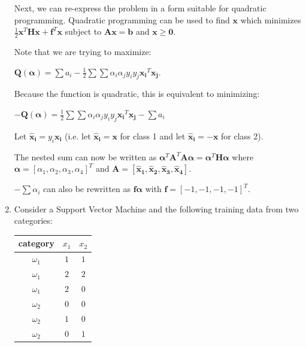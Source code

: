 \documentclass[fleqn]{article}
\begin{document}
\begin{enumerate}
	Next, we can re-express the problem in a form suitable for quadratic programming. Quadratic programming can be used to find $\mathbf{x}$ which minimizes \newline $\frac{1}{2}\mathbf{x}^T\mathbf{H}\mathbf{x} + \mathbf{f}^T\mathbf{x}$ subject to $\mathbf{Ax} = \mathbf{b}$ and $\mathbf{x} \geq \mathbf{0}$.
	
	Note that we are trying to maximize:
	
	$\mathbf{Q(\boldsymbol{\alpha})} = \sum{a_i} - \frac{1}{2}\sum{\sum{\alpha_i\alpha_jy_iy_j\mathbf{x_i}^T\mathbf{x_j}}}$.
	
	Because the function is quadratic, this is equivalent to minimizing:
	
	$-\mathbf{Q(\boldsymbol{\alpha})} = \frac{1}{2}\sum{\sum{\alpha_i\alpha_jy_iy_j\mathbf{x_i}^T\mathbf{x_j}}} - \sum{a_i}$
	
	Let $\mathbf{\hat{x}_i} = y_i\mathbf{x_i}$ (i.e. let $\mathbf{\hat{x}_i} = \mathbf{x}$ for class 1 and let $\mathbf{\hat{x}_i} = -\mathbf{x}$ for class 2).
	
	The nested sum can now be written as $\boldsymbol{\alpha}^T\mathbf{A}^T\mathbf{A}\boldsymbol{\alpha} = \boldsymbol{\alpha}^T\mathbf{H}\boldsymbol{\alpha}$ \newline where $\boldsymbol{\alpha} = [\alpha_1,\alpha_2,\alpha_3,\alpha_4]^T$ and $\mathbf{A} = [\mathbf{\hat{x}_1},\mathbf{\hat{x}_2}, \mathbf{\hat{x}_3}, \mathbf{\hat{x}_4}]$.
	
	$-\sum{\alpha_i}$ can also be rewritten as $\mathbf{f}\boldsymbol{\alpha}$ with $\mathbf{f} = [-1,-1,-1,-1]^T$.
	  
	\item Consider a Support Vector Machine and the following training data from two categories:
	
	\begin{center}
	\begin{tabular}{| c | c | c |}
		\hline
		category & $x_1$ & $x_2$ \\
		\hline
		$\omega_1$ & $1$ & $1$ \\
		$\omega_1$ & $2$ & $2$ \\
		$\omega_1$ & $2$ & $0$ \\
		\hline
		$\omega_2$ & $0$ & $0$ \\
		$\omega_2$ & $1$ & $0$ \\
		$\omega_2$ & $0$ & $1$ \\
		\hline
	\end{tabular}
	\end{center}
	

\end{enumerate}
\end{document}
